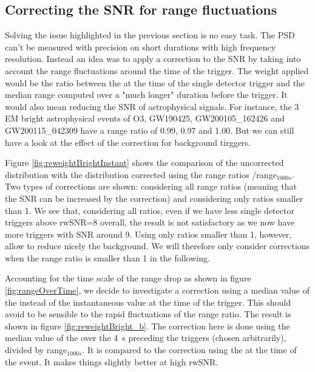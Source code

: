 \clearpage
\subsection{Correcting the SNR for range fluctuations}
\label{sec:correc_snr_range}

Solving the issue highlighted in the previous section is no easy task.
The PSD can't be measured with precision on short durations with high frequency resolution.
Instead an idea was to apply a correction to the SNR by taking into account the range fluctuations around the time of the trigger.
The weight applied would be the ratio between the \medr{} at the time of the single detector trigger and the median range computed over a "much longer" duration before the trigger.
It would also mean reducing the SNR of astrophysical signals.
For instance, the 3 EM bright astrophysical events of O3, GW190425, GW200105\_162426 and GW200115\_042309 have a range ratio of 0.99, 0.97 and 1.00.
But we can still have a look at the effect of the correction for background tirggers.

Figure \ref{fig:reweightBrightInstant} shows the comparison of the uncorrected distribution with the distribution corrected using the range ratios \medr{}/range$_{1000s}$.
Two types of corrections are shown: considering all range ratios (meaning that the SNR can be increased by the correction) and considering only ratios smaller than 1.
We see that, considering all ratios, even if we have less single detector triggers above rwSNR=8 overall, the result is not satisfactory as we now have more triggers with SNR around 9.
Using only ratios smaller than 1, however, allow to reduce nicely the background.
We will therefore only consider corrections when the range ratio is smaller than 1 in the following.

Accounting for the time scale of the range drop as shown in figure \ref{fig:rangeOverTime}, we decide to investigate a correction using a median value of the \medr{} instead of the instantaneous value at the time of the trigger.
This should avoid to be sensible to the rapid fluctuations of the range ratio.
The result is shown in figure \ref{fig:reweightBright_b}.
The correction here is done using the median value of the \medr{} over the \SI{4}{s} preceding the triggers (chosen arbitrarily), divided by range$_{1000s}$.
It is compared to the correction using the \medr{} at the time of the event.
It makes things slightly better at high rwSNR.

